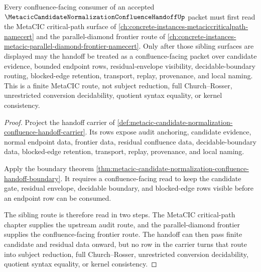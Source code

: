 \begin{theorem}
\label{thm:metacic-candidate-normalization-confluence-handoff-criticalpath-parallel-frontier-route}
Every confluence-facing consumer of an accepted $\MetacicCandidateNormalizationConfluenceHandoffUp$ packet must first read the MetaCIC critical-path surface of \autoref{ch:concrete-instances-metaciccriticalpath-namecert} and the parallel-diamond frontier route of \autoref{ch:concrete-instances-metacic-parallel-diamond-frontier-namecert}. Only after those sibling surfaces are displayed may the handoff be treated as a confluence-facing packet over candidate evidence, bounded endpoint rows, residual-envelope visibility, decidable-boundary routing, blocked-edge retention, transport, replay, provenance, and local naming. This is a finite MetaCIC route, not subject reduction, full Church--Rosser, unrestricted conversion decidability, quotient syntax equality, or kernel consistency.
\end{theorem}
\begin{proof}
Project the handoff carrier of \autoref{def:metacic-candidate-normalization-confluence-handoff-carrier}. Its rows expose audit anchoring, candidate evidence, normal endpoint data, frontier data, residual confluence data, decidable-boundary data, blocked-edge retention, transport, replay, provenance, and local naming.

Apply the boundary theorem \autoref{thm:metacic-candidate-normalization-confluence-handoff-boundary}. It requires a confluence-facing read to keep the candidate gate, residual envelope, decidable boundary, and blocked-edge rows visible before an endpoint row can be consumed.

The sibling route is therefore read in two steps. The MetaCIC critical-path chapter supplies the upstream audit route, and the parallel-diamond frontier supplies the confluence-facing frontier route. The handoff can then pass finite candidate and residual data onward, but no row in the carrier turns that route into subject reduction, full Church--Rosser, unrestricted conversion decidability, quotient syntax equality, or kernel consistency.
\end{proof}
